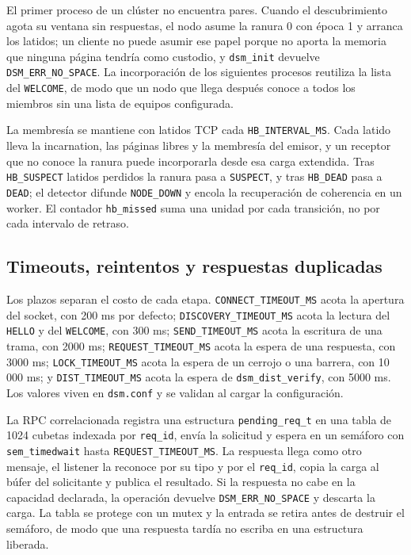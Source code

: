 El primer proceso de un clúster no encuentra pares. Cuando el descubrimiento agota su ventana sin respuestas, el nodo asume la ranura 0 con época 1 y arranca los latidos; un cliente no puede asumir ese papel porque no aporta la memoria que ninguna página tendría como custodio, y \texttt{dsm\_init} devuelve \texttt{DSM\_ERR\_NO\_SPACE}. La incorporación de los siguientes procesos reutiliza la lista del \texttt{WELCOME}, de modo que un nodo que llega después conoce a todos los miembros sin una lista de equipos configurada.

La membresía se mantiene con latidos TCP cada \texttt{HB\_INTERVAL\_MS}. Cada latido lleva la incarnation, las páginas libres y la membresía del emisor, y un receptor que no conoce la ranura puede incorporarla desde esa carga extendida. Tras \texttt{HB\_SUSPECT} latidos perdidos la ranura pasa a \texttt{SUSPECT}, y tras \texttt{HB\_DEAD} pasa a \texttt{DEAD}; el detector difunde \texttt{NODE\_DOWN} y encola la recuperación de coherencia en un worker. El contador \texttt{hb\_missed} suma una unidad por cada transición, no por cada intervalo de retraso.

\subsection{Timeouts, reintentos y respuestas duplicadas}

Los plazos separan el costo de cada etapa. \texttt{CONNECT\_TIMEOUT\_MS} acota la apertura del socket, con 200 ms por defecto; \texttt{DISCOVERY\_TIMEOUT\_MS} acota la lectura del \texttt{HELLO} y del \texttt{WELCOME}, con 300 ms; \texttt{SEND\_TIMEOUT\_MS} acota la escritura de una trama, con 2000 ms; \texttt{REQUEST\_TIMEOUT\_MS} acota la espera de una respuesta, con 3000 ms; \texttt{LOCK\_TIMEOUT\_MS} acota la espera de un cerrojo o una barrera, con 10 000 ms; y \texttt{DIST\_TIMEOUT\_MS} acota la espera de \texttt{dsm\_dist\_verify}, con 5000 ms. Los valores viven en \texttt{dsm.conf} y se validan al cargar la configuración.

La RPC correlacionada registra una estructura \texttt{pending\_req\_t} en una tabla de 1024 cubetas indexada por \texttt{req\_id}, envía la solicitud y espera en un semáforo con \texttt{sem\_timedwait} hasta \texttt{REQUEST\_TIMEOUT\_MS}. La respuesta llega como otro mensaje, el listener la reconoce por su tipo y por el \texttt{req\_id}, copia la carga al búfer del solicitante y publica el resultado. Si la respuesta no cabe en la capacidad declarada, la operación devuelve \texttt{DSM\_ERR\_NO\_SPACE} y descarta la carga. La tabla se protege con un mutex y la entrada se retira antes de destruir el semáforo, de modo que una respuesta tardía no escriba en una estructura liberada.

